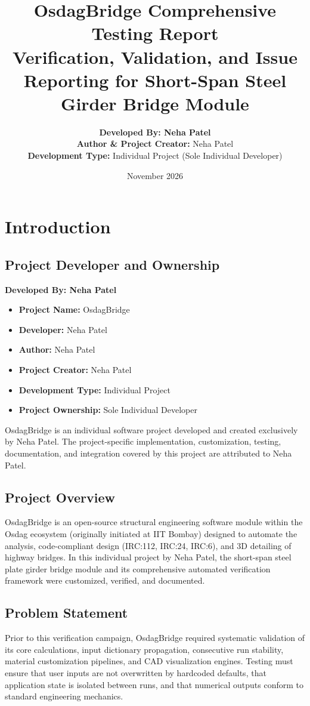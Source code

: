 \documentclass[11pt,a4paper]{report}
\title{\textbf{\LARGE OsdagBridge Comprehensive Testing Report}\\
\large Verification, Validation, and Issue Reporting for Short-Span Steel Girder Bridge Module}
\author{\textbf{Developed By: Neha Patel} \\
\textbf{Author \& Project Creator:} Neha Patel \\
\textbf{Development Type:} Individual Project (Sole Individual Developer)}
\date{November 2026}
\begin{document}
\maketitle
\tableofcontents
\newpage

\chapter{Introduction}
\section{Project Developer and Ownership}
\textbf{Developed By: Neha Patel}
\begin{itemize}
    \item \textbf{Project Name:} OsdagBridge
    \item \textbf{Developer:} Neha Patel
    \item \textbf{Author:} Neha Patel
    \item \textbf{Project Creator:} Neha Patel
    \item \textbf{Development Type:} Individual Project
    \item \textbf{Project Ownership:} Sole Individual Developer
\end{itemize}
OsdagBridge is an individual software project developed and created exclusively by Neha Patel. The project-specific implementation, customization, testing, documentation, and integration covered by this project are attributed to Neha Patel.

\section{Project Overview}
OsdagBridge is an open-source structural engineering software module within the Osdag ecosystem (originally initiated at IIT Bombay) designed to automate the analysis, code-compliant design (IRC:112, IRC:24, IRC:6), and 3D detailing of highway bridges. In this individual project by Neha Patel, the short-span steel plate girder bridge module and its comprehensive automated verification framework were customized, verified, and documented.

\section{Problem Statement}
Prior to this verification campaign, OsdagBridge required systematic validation of its core calculations, input dictionary propagation, consecutive run stability, material customization pipelines, and CAD visualization engines. Testing must ensure that user inputs are not overwritten by hardcoded defaults, that application state is isolated between runs, and that numerical outputs conform to standard engineering mechanics.
\end{document}
